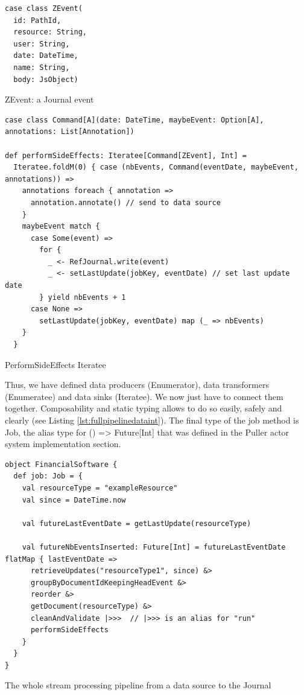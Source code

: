 \begin{listing}[h]
\begin{verbatim}
case class ZEvent(
  id: PathId,
  resource: String,
  user: String,
  date: DateTime,
  name: String,
  body: JsObject)
\end{verbatim}
\caption{ZEvent: a Journal event}
\label{lst:zevent}
\end{listing}

\begin{listing}[h]
\begin{verbatim}
case class Command[A](date: DateTime, maybeEvent: Option[A], annotations: List[Annotation]) 

def performSideEffects: Iteratee[Command[ZEvent], Int] =
  Iteratee.foldM(0) { case (nbEvents, Command(eventDate, maybeEvent, annotations)) =>
    annotations foreach { annotation =>
      annotation.annotate() // send to data source
    }
    maybeEvent match {
      case Some(event) =>
        for {
          _ <- RefJournal.write(event)
          _ <- setLastUpdate(jobKey, eventDate) // set last update date
        } yield nbEvents + 1
      case None =>
        setLastUpdate(jobKey, eventDate) map (_ => nbEvents)
    }
  }
\end{verbatim}
\caption{PerformSideEffects Iteratee}
\label{lst:finaliterateedataint}
\end{listing}

Thus, we have defined data producers (Enumerator), data transformers (Enumeratee) and data sinks (Iteratee). We now just have to connect them together. Composability
and static typing allows to do so easily, safely and clearly (see Listing \ref{lst:fullpipelinedataint}). The final type of the job method is Job, the alias type for
() => Future[Int] that was defined in the Puller actor system implementation section.

\begin{listing}[h]
\begin{verbatim}
object FinancialSoftware {
  def job: Job = {
    val resourceType = "exampleResource"
    val since = DateTime.now

    val futureLastEventDate = getLastUpdate(resourceType)

    val futureNbEventsInserted: Future[Int] = futureLastEventDate flatMap { lastEventDate =>
      retrieveUpdates("resourceType1", since) &>
      groupByDocumentIdKeepingHeadEvent &>
      reorder &>
      getDocument(resourceType) &>
      cleanAndValidate |>>>  // |>>> is an alias for "run"
      performSideEffects
    }
  }
}

\end{verbatim}
\caption{The whole stream processing pipeline from a data source to the Journal}
\label{lst:fullpipelinedataint}
\end{listing}


